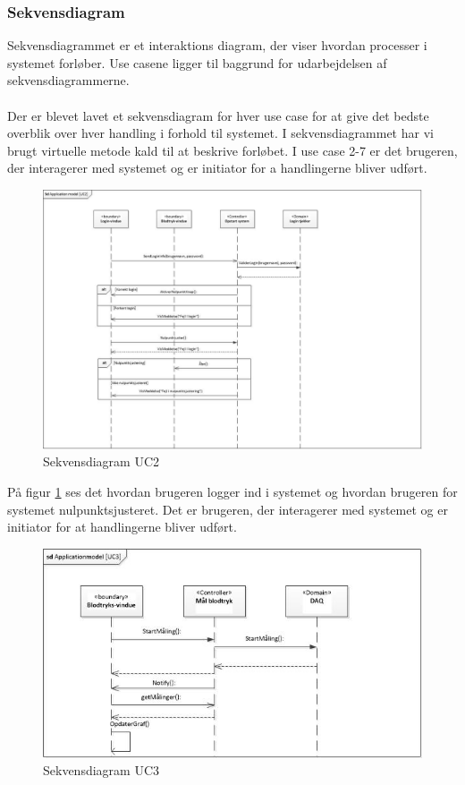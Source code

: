 \subsubsection{Sekvensdiagram}
Sekvensdiagrammet er et interaktions diagram, der viser hvordan processer i systemet forløber. Use casene ligger til baggrund for udarbejdelsen af sekvensdiagrammerne.\\ \\
Der er blevet lavet et sekvensdiagram for hver use case for at give det bedste overblik over hver handling i forhold til systemet. I sekvensdiagrammet har vi brugt virtuelle metode kald til at beskrive forløbet. I use case 2-7 er det brugeren, der interagerer med systemet og er initiator for a handlingerne bliver udført.

\begin{figure}[H]
	\centering
	\includegraphics[width=1\textwidth]{Figurer/ISE/sdAppModelUC2}
	\caption{Sekvensdiagram UC2}
	\label{sd UC2}
\end{figure}

På figur \ref{sd UC2} ses det hvordan brugeren logger ind i systemet og hvordan brugeren for systemet nulpunktsjusteret. Det er brugeren, der interagerer med systemet og er initiator for at handlingerne bliver udført. 

\begin{figure}[H]
	\includegraphics[width=1\textwidth]{Figurer/ISE/sdAppModelUC3}
	\caption{Sekvensdiagram UC3}
	\label{sd UC3}
\end{figure}

